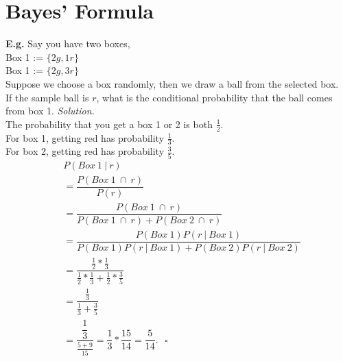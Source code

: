 \documentclass[12pt]{book}
\begin{document}
\section{Bayes' Formula}
\textbf{E.g.} Say you have two boxes, \\
Box 1 := $\{2g,1r\}$\\
Box 1 := $\{2g,3r\}$\\

\noindent Suppose we choose a box randomly,
then we draw a ball from the selected box.\\
If the sample ball is $r$, what is the conditional probability 
that the ball comes from box 1.
\newpage
\noindent \textit{Solution.}\\
The probability that you get a box 1 or 2 is both $\frac{1}{2}$.\\
For box 1, getting red has probability $\frac{1}{3}$.\\
\noindent For box 2, getting red has probability $\frac{3}{5}$.\\
\begin{align*}
&P(Box~1~|~r)\\
&=\dfrac{P(Box~1~\cap~r)}{P(r)}\\
&=\dfrac{P(Box~1~\cap~r)}{P(Box~1~\cap~r)+P(Box~2~\cap~r)}\\
&=\dfrac{P(Box~1)P(r~|~Box~1)}{P(Box~1)P(r~|~Box~1)+P(Box~2)P(r~|~Box~2)}\\
&=\dfrac{\frac{1}{2}* \frac{1}{3}}{\frac{1}{2} * \frac{1}{3} + \frac{1}{2} * \frac{3}{5}}\\
&=\dfrac{\frac{1}{3}}{\frac{1}{3} + \frac{3}{5}}\\
&=\dfrac{\dfrac{1}{3}}{\frac{5+9}{15}}=\dfrac{1}{3}* \dfrac{15}{14}=\dfrac{5}{14}.~~~\square
\end{align*}
\end{document}
